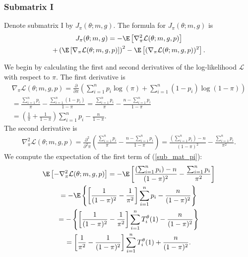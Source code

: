 \documentclass[12pt]{article}
\begin{document}
\begin{appendices}
\subsubsection*{Submatrix I}
Denote submatrix I by $J_{\pi}(\theta; m, g).$ The formula for $J_{\pi}(\theta; m, g)$ is 
\begin{multline}\label{sub_mat_pi}
J_{\pi}(\theta; m, g) = -\E\left[\nabla^2_\pi \mathcal{L}(\theta; m, g, p) \right] \\ + \left(\E\left[ \nabla_\pi \mathcal{L}(\theta; m, g, p) \right] \right)^2 - \E\left[(\nabla_\pi \mathcal{L}(\theta; m, g, p))^2 \right].
\end{multline}

We begin by calculating the first and second derivatives of the log-likelihood $\mathcal{L}$ with respect to $\pi$. The first derivative is
\begin{multline}\label{d_L_d_pi}
\nabla_\pi \mathcal{L}(\theta; m, g, p) = \frac{\partial }{\partial \pi } \left( \sum_{i=1}^n p_i \log(\pi) + \sum_{i=1}^n (1 - p_i) \log(1 - \pi) \right) \\ = \frac{ \sum_{i=1}^n p_i }{\pi} - \frac{ \sum_{i=1}^n (1 - p_i) }{ 1 - \pi } = \frac{\sum_{i=1}^n p_i}{\pi} - \frac{n - \sum_{i=1}^n p_i}{1 - \pi} \\ = \left( \frac{1}{\pi} + \frac{1}{1 - \pi} \right) \sum_{i=1}^n p_i - \frac{n}{1-\pi}.
\end{multline}
The second derivative is
\begin{multline*}
\nabla^2_\pi \mathcal{L}(\theta; m, g, p)  = \frac{\partial^2}{\partial^2\pi} \left( \frac{ \sum_{i=1}^n p_i }{ \pi } - \frac{ n - \sum_{i=1}^n p_i }{1 - \pi}  \right) = \frac{\left( \sum_{i=1}^n p_i \right) - n}{(1 - \pi)^2} - \frac{\sum_{i=1}^n p_i }{ \pi^2 }.
\end{multline*}
We compute the expectation of the first term of (\ref{sub_mat_pi}):
\begin{multline}\label{submat_pi_1}
\E \left[ -\nabla^2_{\pi} \mathcal{L}(\theta; m, g, p)\right] = - \E\left[\frac{ ( \sum_{i=1}^n p_i) - n}{(1 - \pi)^2} - \frac{\sum_{i=1}^n p_i}{\pi^2} \right] \\ = - \E\left\{\left[\frac{1}{(1-\pi)^2} - \frac{1}{\pi^2} \right] \sum_{i=1}^n p_i - \frac{n}{ (1 - \pi)^2 } \right\} \\ = - \left\{\left[ \frac{1}{(1-\pi)^2} - \frac{1}{\pi^2} \right] \sum_{i=1}^n T^\theta_i(1) - \frac{n}{ (1 - \pi)^2}  \right\} \\ = \left[ \frac{1}{\pi^2} - \frac{1}{(1 - \pi)^2} \right] \sum_{i=1}^n T^\theta_i(1) + \frac{n}{(1-\pi)^2}.

\end{multline}
\end{appendices}
\end{document}
